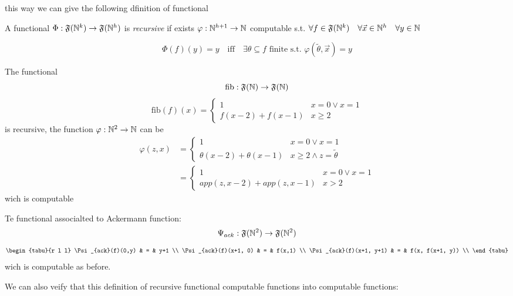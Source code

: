 this way we can give the following dfinition of functional

\begin{definition}
  A functional
  $\Phi : \mathfrak{F}(\mathbb{N}^k) \rightarrow \mathfrak{F}(\mathbb{N}^h)$ is
  \emph{recursive} if exists $\varphi : \mathbb{N}^{h+1} \rightarrow \mathbb{N}$
  computable s.t.
  $\forall f \in \mathfrak{F}(\mathbb{N}^k) \quad \forall \vec{x} \in \mathbb{N}^h
  \quad \forall y \in \mathbb{N}$

  \[
    \Phi(f)(y) = y \quad \mbox{iff} \quad \exists \theta \subseteq f
    \mbox{ finite s.t. } \varphi(\tilde{\theta}, \vec{x}) = y
  \]
\end{definition}

\begin{example}
  The functional
  \newcommand{\fib}[1]{\ensuremath{\mbox{fib}(#1)}}
  \[
    \mbox{fib} : \mathfrak{F}(\mathbb{N}) \rightarrow \mathfrak{F}(\mathbb{N})
  \]
  \[
    \fib{f}(x) = \begin{cases}
      1 & x=0 \lor x=1 \\
      f(x-2) + f(x-1) & x \geq 2
    \end{cases}
  \]
  is recursive, the function $\varphi: \mathbb{N}^2 \rightarrow \mathbb{N}$ can be
  \[
    \begin{aligned}
      \varphi(z, x) &= \begin{cases}
        1 & x=0 \lor x=1 \\
        \theta(x-2) + \theta(x-1) & x \geq 2 \land z = \tilde{\theta}
      \end{cases} \\
      &= \begin{cases}
        1 & x = 0 \lor x = 1 \\
        app(z, x-2) + app(z, x-1) & x > 2
      \end{cases}
    \end{aligned}
  \]
  wich is computable
\end{example}

\begin{example}
Te functional associalted to Ackermann function:
\[
  \Psi_{ack} : \mathfrak{F}(\mathbb{N}^2) \rightarrow \mathfrak{F}(\mathbb{N}^2)
\]
\[
  \begin{tabu}{r l l}
    \Psi_{ack}(f)(0,y)  & = & y+1 \\
    \Psi_{ack}(f)(x+1, 0) & = & f(x,1) \\
    \Psi_{ack}(f)(x+1, y+1)  & = & f(x, f(x+1, y)) \\
  \end{tabu}
\]
wich is computable as before.
\end{example}
We can also veify that this definition of recursive functional
computable functions into computable functions:

